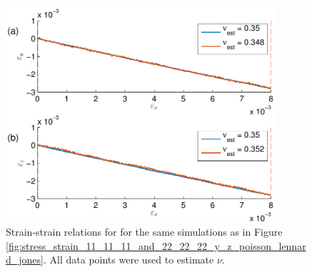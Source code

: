 \begin{figure}
\centering
\includegraphics[width=10cm]{../figures/thesis/strain_strain_11_11_11_and_22_22_22_y_z_poisson_lennard_jones.pdf}
\caption{Strain-strain relations for for the same simulations as in Figure \ref{fig:stress_strain_11_11_11_and_22_22_22_y_z_poisson_lennard_jones}. All data points were used to estimate $\nu$.}
\label{fig:strain_strain_11_11_11_and_22_22_22_y_z_poisson_lennard_jones}
\end{figure}

